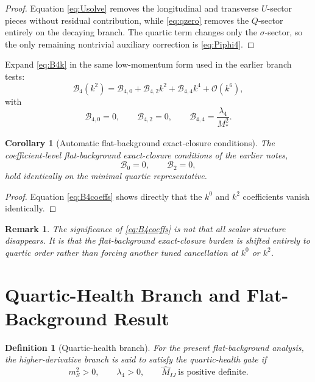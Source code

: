 \documentclass[11pt]{article}
\newtheorem{definition}{Definition}
\newtheorem{remark}{Remark}
\newtheorem{corollary}{Corollary}
\begin{document}
\begin{proof}
Equation \eqref{eq:Usolve} removes the longitudinal and transverse \(U\)-sector pieces without residual contribution, while \eqref{eq:qzero} removes the \(Q\)-sector entirely on the decaying branch. The quartic term changes only the \(\sigma\)-sector, so the only remaining nontrivial auxiliary correction is \eqref{eq:Piphi4}.
\end{proof}

Expand \eqref{eq:B4k} in the same low-momentum form used in the earlier branch tests:
\begin{equation}
\mathcal B_4(k^2)
=
\mathcal B_{4,0}
+\mathcal B_{4,2}k^2
+\mathcal B_{4,4}k^4
+\mathcal O(k^6),
\label{eq:B4expand}
\end{equation}
with
\begin{equation}
\mathcal B_{4,0}=0,
\qquad
\mathcal B_{4,2}=0,
\qquad
\mathcal B_{4,4}=\frac{\lambda_4}{M_*^2}.
\label{eq:B4coeffs}
\end{equation}

\begin{corollary}[Automatic flat-background exact-closure conditions]
The coefficient-level flat-background exact-closure conditions of the earlier notes,
\begin{equation}
\mathcal B_0=0,
\qquad
\mathcal B_2=0,
\label{eq:oldconditions}
\end{equation}
hold identically on the minimal quartic representative.
\end{corollary}

\begin{proof}
Equation \eqref{eq:B4coeffs} shows directly that the \(k^0\) and \(k^2\) coefficients vanish identically.
\end{proof}

\begin{remark}
The significance of \eqref{eq:B4coeffs} is not that all scalar structure disappears. It is that the flat-background exact-closure burden is shifted entirely to quartic order rather than forcing another tuned cancellation at \(k^0\) or \(k^2\).
\end{remark}

\section{Quartic-Health Branch and Flat-Background Result}

\begin{definition}[Quartic-health branch]
For the present flat-background analysis, the higher-derivative branch is said to satisfy the quartic-health gate if
\begin{equation}
m_S^2>0,
\qquad
\lambda_4>0,
\qquad
\widehat M_{IJ}\ \text{is positive definite}.
\label{eq:quartichealth}
\end{equation}
\end{definition}
\end{document}
